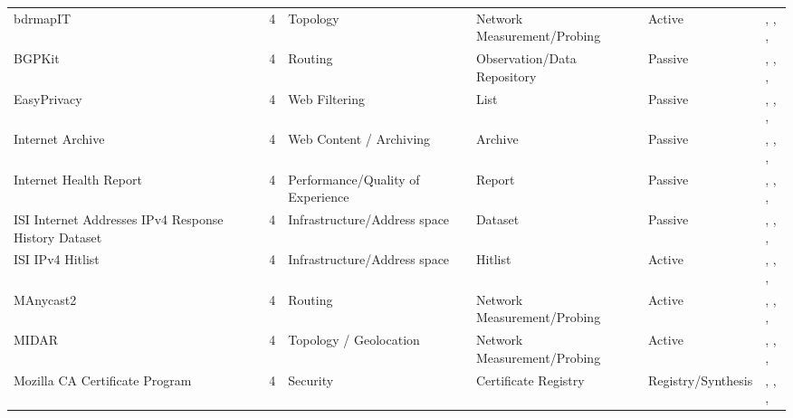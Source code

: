 \documentclass[11pt,a4paper]{article}
\begin{document}
\begin{longtable}{@{}p{}p{}p{}p{}p{}p{}p{}@{}}
bdrmapIT & \cite{10.1145/3278532.3278538} & 4 & Topology & Network Measurement/Probing & Active & \cite{10.1007/978-3-030-72582-2_14}, \cite{10.1007/978-3-030-98785-5_20}, \cite{10.1007/978-3-030-98785-5_29}, \cite{10.1145/3777912.3809135} \\
BGPKit & \cite{bgpkit} & 4 & Routing & Observation/Data Repository & Passive & \cite{10.1145/3646547.3688444}, \cite{10.1007/978-3-031-85960-1_13}, \cite{10.1145/3777912.3809143}, \cite{10.1145/3777912.3839812} \\
EasyPrivacy & \cite{easyprivacy} & 4 & Web Filtering & List & Passive & \cite{10.1145/3730567.3764427}, \cite{10.1145/3618257.3624823}, \cite{10.1145/3487552.3487855}, \cite{10.1145/3777912.3839794} \\
Internet Archive & \cite{internet-archive} & 4 & Web Content / Archiving & Archive & Passive & \cite{10.1145/3646547.3689010}, \cite{10.1145/3517745.3561437}, \cite{10.1007/978-3-031-28486-1_8}, \cite{10.1145/3777912.3809148} \\
Internet Health Report & \cite{internet_health_report} & 4 & Performance/Quality of Experience & Report & Passive & \cite{10.1145/3517745.3561419}, \cite{10.1007/978-3-031-56252-5_10}, \cite{10.1145/3777912.3809137}, \cite{10.1145/3777912.3839831} \\
ISI Internet Addresses IPv4 Response History Dataset & \cite{isi-ipv4-response} & 4 & Infrastructure/Address space & Dataset & Passive & \cite{10.1145/3730567.3764781}, \cite{10.1145/3618257.3624831}, \cite{10.1007/978-3-031-56249-5_8}, \cite{10.1145/3777912.3839790} \\
ISI IPv4 Hitlist & \cite{isi-ipv4-hitlist} & 4 & Infrastructure/Address space & Hitlist & Active & \cite{10.1145/3730567.3764484}, \cite{10.1145/3517745.3561421}, \cite{10.1007/978-3-031-85960-1_16}, \cite{10.1145/3777912.3809139} \\
MAnycast2 & \cite{10.1145/3419394.3423646} & 4 & Routing & Network Measurement/Probing & Active & \cite{10.1145/3517745.3561458}, \cite{10.1007/978-3-031-56252-5_1}, \cite{10.1007/978-3-031-56252-5_6}, \cite{10.1007/978-3-031-85960-1_16} \\
MIDAR & \cite{caida_midar} & 4 & Topology / Geolocation & Network Measurement/Probing & Active & \cite{10.1145/3487552.3487812}, \cite{10.1007/978-3-030-98785-5_20}, \cite{10.1007/978-3-031-85960-1_4}, \cite{10.1007/978-3-031-85960-1_6} \\
Mozilla CA Certificate Program & \cite{mozilla-trust-stores} & 4 & Security & Certificate Registry & Registry/Synthesis & \cite{10.1145/3618257.3624815}, \cite{10.1007/978-3-030-72582-2_11}, \cite{10.1007/978-3-031-28486-1_4}, \cite{10.1145/3646547.3688415} \\

\end{longtable}
\end{document}
